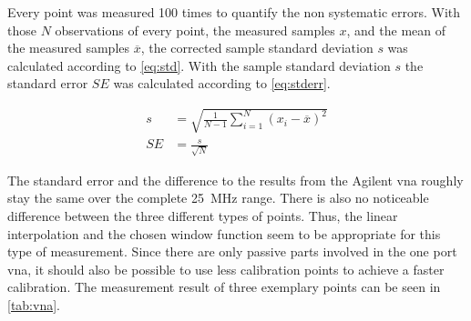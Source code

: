 \documentclass[12pt,a4paper,parskip=full,abstract=true,BCOR=12mm]{scrreprt}
\providecommand{\mean}[1]{\overline{#1}}
\begin{document}
Every point was measured 100 times to quantify the non systematic errors. With those
$N$ observations of every point, the measured samples $x$, and the mean of the measured samples
$\mean{x}$, the corrected sample standard deviation $s$ was calculated according to \cref{eq:std}.
With the sample standard deviation $s$ the standard error $S\!E$ was calculated according to \cref{eq:stderr}.

\begin{align}
    \label{eq:std} s &= \sqrt{\frac{1}{N-1} \sum^N_{i=1} (x_i - \mean{x})^2} \\
    \label{eq:stderr} S\!E &= \frac{s}{\sqrt{N}}
\end{align}

The standard error and the difference to the results from the Agilent \gls{vna} roughly stay the
same over the complete \SI{25}{\mega\hertz} range. There is also no noticeable difference between
the three different types of points. Thus, the linear interpolation and the chosen window function
seem to be appropriate for this type of measurement. Since there are only passive parts involved
in the one port \gls{vna}, it should also be possible to use less calibration points to achieve a
faster calibration. The measurement result of three exemplary points can be seen in \cref{tab:vna}.
\end{document}

